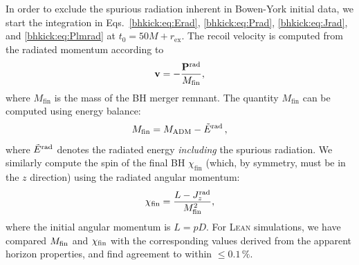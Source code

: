In order to exclude the spurious radiation inherent in Bowen-York initial 
data, we start the integration in Eqs.~\eqref{bhkick:eq:Erad}, \eqref{bhkick:eq:Prad}, 
\eqref{bhkick:eq:Jrad}, and \eqref{bhkick:eq:Plmrad} at $t_0 = 50M + r_{\mathrm{ex}}$. The 
recoil velocity is computed from the radiated momentum according to 
%
\begin{equation}
    \mathbf{v}=-\frac{\mathbf{P}^{\mathrm{rad}}}{M_{\mathrm{fin}}},
\end{equation}
%
where $M_{\mathrm{fin}}$ is the mass of the BH merger remnant. The 
quantity $M_{\mathrm{fin}}$ can be computed using energy balance:
\begin{equation}
    M_{\mathrm{fin}} = M_{\mathrm{ADM}} - \tilde{E}^{\mathrm{rad}}\,,
\end{equation}
where $\tilde{E}^{\rm rad}$ denotes the radiated energy
{\it including} the spurious radiation.
We similarly compute the spin of the final BH $\chi_{\mathrm{fin}}$ (which,
by symmetry, must be in the $z$ direction) using the radiated angular 
momentum:
\begin{equation}
    \chi_{\mathrm{fin}} = \frac{L-J^{\mathrm{rad}}_z}{M_{\mathrm{fin}}^2},
\end{equation}
where the initial angular momentum is $L=pD$. For \textsc{Lean} simulations, 
we have compared $M_{\rm fin}$ and $\chi_{\rm fin}$ with the
corresponding values derived from the apparent horizon properties,
and find agreement to within $\leq 0.1\,\%$.


